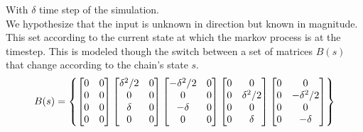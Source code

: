 \documentclass[twocolumn]{article}
\begin{document}
    With $\delta$ time step of the simulation.
    \\
    We hypothesize that the input is unknown in direction but known in magnitude. This set according to the current state at which the markov process is at the timestep.
    This is modeled though the switch between a set of matrices $B(s)$ that change according to the chain's state $s$.
    \begin{equation*}%
        \resizebox{.9 \columnwidth}{!}{
        $B(s)=\begin{Bmatrix}
            \begin{bmatrix}
                0 & 0 \\
                0          & 0 \\
                0     & 0 \\
                0          & 0 \\
            \end{bmatrix}
            \begin{bmatrix}
                \delta^2/2 & 0 \\
                0          & 0 \\
                \delta     & 0 \\
                0          & 0 \\
            \end{bmatrix}
            \begin{bmatrix}
                -\delta^2/2 & 0 \\
                0          & 0 \\
                -\delta     & 0 \\
                0          & 0 \\
            \end{bmatrix}
            \begin{bmatrix}
                0 & 0          \\
                0 & \delta^2/2 \\
                0 & 0          \\
                0 & \delta     \\
            \end{bmatrix}
            \begin{bmatrix}
                0 & 0          \\
                0 & -\delta^2/2 \\
                0 & 0          \\
                0 & -\delta     \\
            \end{bmatrix}
        \end{Bmatrix} $ 
        }
    \end{equation*}
       
\end{document}
